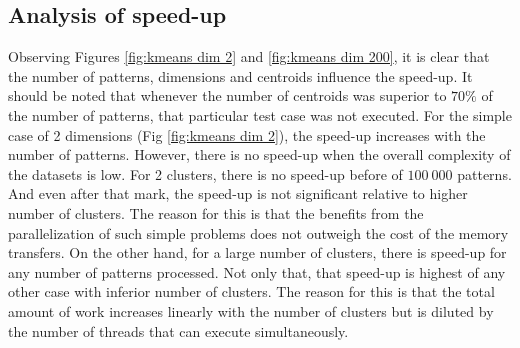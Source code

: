 


\subsection{Analysis of speed-up}

Observing Figures \ref{fig:kmeans dim 2} and \ref{fig:kmeans dim 200}, it is clear that the number of patterns, dimensions and centroids influence the speed-up.
It should be noted that whenever the number of centroids was superior to $70\%$ of the number of patterns, that particular test case was not executed.
For the simple case of 2 dimensions (Fig \ref{fig:kmeans dim 2}), the speed-up increases with the number of patterns.
However, there is no speed-up when the overall complexity of the datasets is low.
For 2 clusters, there is no speed-up before of $100 \: 000$ patterns.
And even after that mark, the speed-up is not significant relative to higher number of clusters.
The reason for this is that the benefits from the parallelization of such simple problems does not outweigh the cost of the memory transfers.
On the other hand, for a large number of clusters, there is speed-up for any number of patterns processed.
Not only that, that speed-up is highest of any other case with inferior number of clusters.
The reason for this is that the total amount of work increases linearly with the number of clusters but is diluted by the number of threads that can execute simultaneously.

